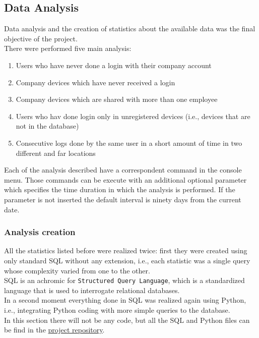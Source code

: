 \documentclass[12pt, a4paper, oneside]{article}
\begin{document}
\subsection{Data Analysis}
Data analysis and the creation of statistics about the available data was the final objective of the project.\\
There were performed five main analysis:
\begin{enumerate}
    \item Users who have never done a login with their company account
    \item Company devices which have never received a login
    \item Company devices which are shared with more than one employee
    \item Users who hav done login only in unregistered devices (i.e., devices that are not in the database)
    \item Consecutive logs done by the same user in a short amount of time in two different and far locations 
\end{enumerate}
\newpage
Each of the analysis described have a correspondent command in the console menu. Those commands can be execute with an additional optional parameter which specifies the time duration in which the analysis is performed.
If the parameter is not inserted the default interval is ninety days from the current date. 

\subsubsection{Analysis creation}
All the statistics listed before were realized twice: first they were created using only standard SQL without any extension, i.e., each statistic was a single query whose complexity varied from one to the other.\\
SQL is an achromic for \texttt{Structured Query Language}, which is a standardized language that is used to interrogate relational databases.\\
In a second moment everything done in SQL was realized again using Python, i.e., integrating Python coding with more simple queries to the database.\\
In this section there will not be any code, but all the SQL and Python files can be find in the \href{https:\\github.com}{project repository}.
\end{document}
